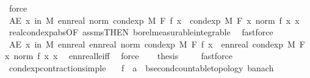 \begin{isabellebody}
\ force\isanewline
\ \ \isamarkupfalse%
\ \isamarkupfalse%
\ {\isachardoublequoteopen}AE\ x\ in\ M{\isachardot}{\kern0pt}\ ennreal\ {\isacharparenleft}{\kern0pt}norm\ {\isacharparenleft}{\kern0pt}cond{\isacharunderscore}{\kern0pt}exp\ M\ F\ f\ x{\isacharparenright}{\kern0pt}{\isacharparenright}{\kern0pt}\ {\isasymle}\ cond{\isacharunderscore}{\kern0pt}exp\ M\ F\ {\isacharparenleft}{\kern0pt}{\isasymlambda}x{\isachardot}{\kern0pt}\ norm\ {\isacharparenleft}{\kern0pt}f\ x{\isacharparenright}{\kern0pt}{\isacharparenright}{\kern0pt}\ x{\isachardoublequoteclose}\ \isamarkupfalse%
\ real{\isacharunderscore}{\kern0pt}cond{\isacharunderscore}{\kern0pt}exp{\isacharunderscore}{\kern0pt}abs{\isacharbrackleft}{\kern0pt}OF\ assms{\isacharbrackleft}{\kern0pt}THEN\ borel{\isacharunderscore}{\kern0pt}measurable{\isacharunderscore}{\kern0pt}integrable{\isacharbrackright}{\kern0pt}{\isacharbrackright}{\kern0pt}\ \isamarkupfalse%
\ fastforce\isanewline
\ \ \isamarkupfalse%
\ {\isachardoublequoteopen}AE\ x\ in\ M{\isachardot}{\kern0pt}\ enn{}real\ {\isacharparenleft}{\kern0pt}ennreal\ {\isacharparenleft}{\kern0pt}norm\ {\isacharparenleft}{\kern0pt}cond{\isacharunderscore}{\kern0pt}exp\ M\ F\ f\ x{\isacharparenright}{\kern0pt}{\isacharparenright}{\kern0pt}{\isacharparenright}{\kern0pt}\ {\isasymle}\ enn{}real\ {\isacharparenleft}{\kern0pt}cond{\isacharunderscore}{\kern0pt}exp\ M\ F\ {\isacharparenleft}{\kern0pt}{\isasymlambda}x{\isachardot}{\kern0pt}\ norm\ {\isacharparenleft}{\kern0pt}f\ x{\isacharparenright}{\kern0pt}{\isacharparenright}{\kern0pt}\ x{\isacharparenright}{\kern0pt}{\isachardoublequoteclose}\ \isamarkupfalse%
\ ennreal{\isacharunderscore}{\kern0pt}le{\isacharunderscore}{\kern0pt}iff{}\ \isamarkupfalse%
\ force\isanewline
\ \ \isamarkupfalse%
\ {\isacharquery}{\kern0pt}thesis\ \isamarkupfalse%
\ {\isacharasterisk}{\kern0pt}\ \isamarkupfalse%
\ fastforce\isanewline
{}\isamarkupfalse%
%
\endisatagproof
{\isafoldproof}%
%
\isadelimproof
\isanewline
%
\endisadelimproof
\isanewline
{}\isamarkupfalse%
\ cond{\isacharunderscore}{\kern0pt}exp{\isacharunderscore}{\kern0pt}contraction{\isacharunderscore}{\kern0pt}simple{\isacharcolon}{\kern0pt}\isanewline
\ \ \ f\ {\isacharcolon}{\kern0pt}{\isacharcolon}{\kern0pt}\ {\isachardoublequoteopen}{\isacharprime}{\kern0pt}a\ {\isasymRightarrow}\ {\isacharprime}{\kern0pt}b{\isacharcolon}{\kern0pt}{\isacharcolon}{\kern0pt}{\isacharbraceleft}{\kern0pt}second{\isacharunderscore}{\kern0pt}countable{\isacharunderscore}{\kern0pt}topology{\isacharcomma}{\kern0pt}\ banach{\isacharbraceright}{\kern0pt}{\isachardoublequoteclose}\isanewline

\end{isabellebody}

